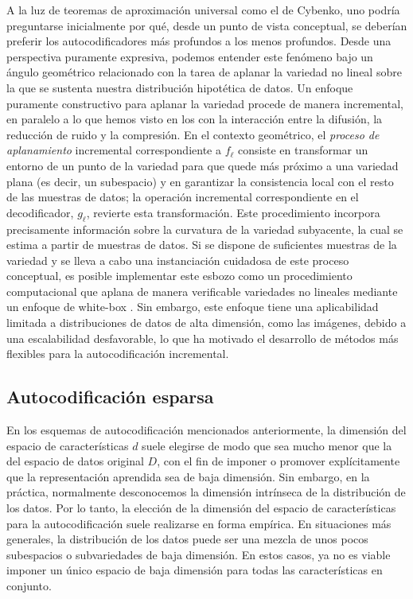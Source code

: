 \documentclass[../../book-main_es.tex]{subfiles}
\begin{document}
A la luz de teoremas de aproximación universal como el de Cybenko, uno
podría preguntarse inicialmente por qué, desde un punto de vista conceptual, se deberían preferir
los autocodificadores más profundos a los menos profundos.
Desde una perspectiva puramente expresiva, podemos entender este fenómeno
bajo un ángulo geométrico relacionado con la tarea de aplanar la variedad no lineal
sobre la que se sustenta nuestra distribución hipotética de datos. Un enfoque puramente
constructivo para aplanar la variedad procede de manera incremental, en
paralelo a lo que hemos visto en los
 con
la interacción entre la difusión, la reducción de ruido y la compresión. En el contexto geométrico,
el \textit{proceso de aplanamiento} incremental correspondiente a $f_{\ell}$
consiste en transformar un entorno de un punto de la variedad para que
quede más próximo a una variedad plana (es decir, un subespacio) y en garantizar la consistencia local
con el resto de las muestras de datos; la operación incremental correspondiente en
el decodificador, $g_{\ell}$, revierte esta transformación. Este procedimiento incorpora precisamente
información sobre la curvatura de la variedad subyacente, la cual se
estima a partir de muestras de datos. Si se dispone de suficientes muestras de la variedad y
se lleva a cabo una instanciación cuidadosa de este proceso conceptual, es posible implementar
este esbozo como un procedimiento computacional que aplana de manera verificable variedades no lineales
mediante un enfoque de white-box \cite{Psenka-JMLR24}. Sin embargo, este enfoque tiene
una aplicabilidad limitada a distribuciones de datos de alta dimensión, como
las imágenes, debido a una escalabilidad desfavorable, lo que ha motivado el desarrollo de métodos más
flexibles para la autocodificación incremental.

\subsection{Autocodificación esparsa}
En los esquemas de autocodificación mencionados anteriormente, la dimensión del espacio de características
$d$ suele elegirse de modo que sea mucho menor que la del espacio de datos
original $D$, con el fin de imponer o promover explícitamente que la representación aprendida
sea de baja dimensión. Sin embargo, en la práctica,
normalmente desconocemos la dimensión intrínseca de la distribución de los datos.
Por lo tanto, la elección de la dimensión del espacio de características para
la autocodificación suele realizarse en forma empírica. En situaciones más generales,
la distribución de los datos puede ser una mezcla de unos pocos subespacios
o subvariedades de baja dimensión. En estos casos, ya no es viable
imponer un único espacio de baja dimensión para todas las características en conjunto.
\end{document}
